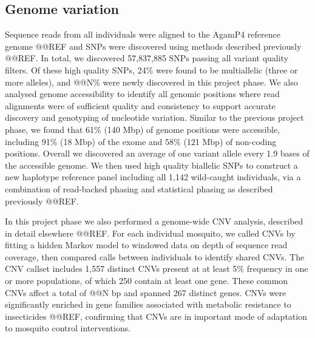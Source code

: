 \documentclass[a4paper,11pt,abstracton,hidelinks]{scrartcl}
\begin{document}
%


\subsection*{Genome variation}


%
Sequence reads from all individuals were aligned to the AgamP4 reference genome @@REF and SNPs were discovered using methods described previously @@REF.
%
In total, we discovered 57,837,885 SNPs passing all variant quality filters. 
%
Of these high quality SNPs, 24\% were found to be multiallelic (three or more alleles), and @@N\% were newly discovered in this project phase.
%
We also analysed genome accessibility to identify all genomic positions where read alignments were of sufficient quality and consistency to support accurate discovery and genotyping of nucleotide variation.
%
Similar to the previous project phase, we found that 61\% (140 Mbp) of genome positions were accessible, including 91\% (18 Mbp) of the exome and 58\% (121 Mbp) of non-coding positions.
%
Overall we discovered an average of one variant allele every 1.9 bases of the accessible genome.
%
We then used high quality biallelic SNPs to construct a new haplotype reference panel including all 1,142 wild-caught individuals, via a combination of read-backed phasing and statistical phasing as described previously @@REF. 


In this project phase we also performed a genome-wide CNV analysis, described in detail elsewhere @@REF.
%
For each individual mosquito, we called CNVs by fitting a hidden Markov model to windowed data on depth of sequence read coverage, then compared calls between individuals to identify shared CNVs.
%
The CNV callset includes 1,557 distinct CNVs present at at least 5\% frequency in one or more populations, of which 250 contain at least one gene.
%
These common CNVs affect a total of @@N bp and spanned 267 distinct genes.
%
CNVs were significantly enriched in gene families associated with metabolic resistance to insecticides @@REF, confirming that CNVs are in important mode of adaptation to mosquito control interventions.
\end{document}
